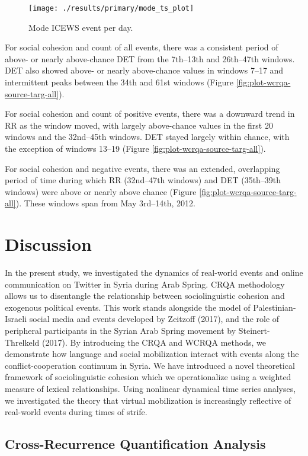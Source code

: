 \documentclass[
  english,
  man]{apa6}
\begin{document}
\begin{figure}
\texttt{[image: ./results/primary/mode\_ts\_plot]} \caption{Mode ICEWS event per day.}\label{fig:plot-mode-event}
\end{figure}

For social cohesion and count of all events, there was a consistent period of
above- or nearly above-chance DET from the 7th--13th and 26th--47th windows. DET
also showed above- or nearly above-chance values in windows 7--17 and
intermittent peaks between the 34th and 61st windows (Figure
\ref{fig:plot-wcrqa-source-targ-all}).

For social cohesion and count of positive events, there was a downward trend in
RR as the window moved, with largely above-chance values in the first 20 windows
and the 32nd--45th windows. DET stayed largely within chance, with the exception
of windows 13--19 (Figure \ref{fig:plot-wcrqa-source-targ-all}).

For social cohesion and negative events, there was an extended, overlapping
period of time during which RR (32nd--47th windows) and DET (35th--39th windows)
were above or nearly above chance (Figure
\ref{fig:plot-wcrqa-source-targ-all}). These windows span from May 3rd--14th,
2012.

\hypertarget{discussion}{%
\section{Discussion}\label{discussion}}

In the present study, we investigated the dynamics of real-world events and
online communication on Twitter in Syria during Arab Spring. CRQA methodology
allows us to disentangle the relationship between sociolinguistic cohesion and
exogenous political events. This work stands alongside the model of
Palestinian-Israeli social media and events developed by Zeitzoff (2017), and
the role of peripheral participants in the Syrian Arab Spring movement by
Steinert-Threlkeld (2017). By introducing the CRQA and WCRQA methods, we
demonstrate how language and social mobilization interact with events along the
conflict-cooperation continuum in Syria. We have introduced a novel theoretical
framework of sociolinguistic cohesion which we operationalize using a weighted
measure of lexical relationships. Using nonlinear dynamical time series
analyses, we investigated the theory that virtual mobilization is increasingly
reflective of real-world events during times of strife.

\hypertarget{cross-recurrence-quantification-analysis-2}{%
\subsection{Cross-Recurrence Quantification Analysis}\label{cross-recurrence-quantification-analysis-2}}
\end{document}
